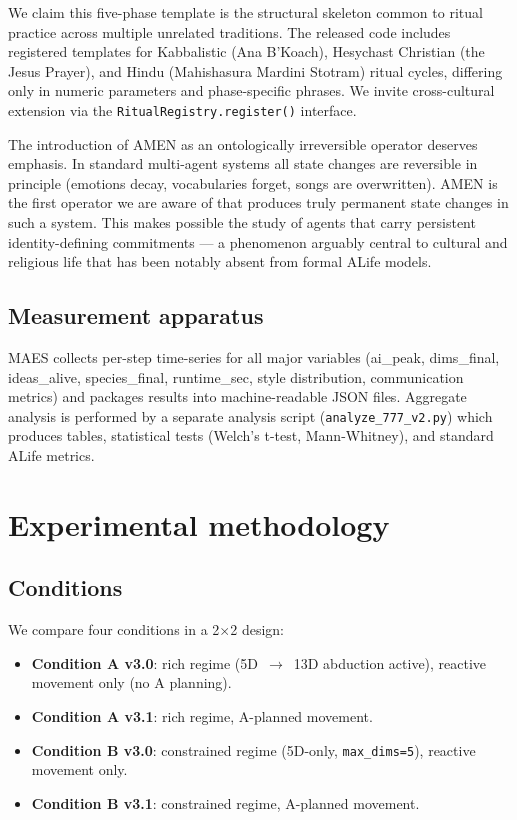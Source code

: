 \documentclass[11pt,a4paper]{article}
\begin{document}
We claim this five-phase template is the structural skeleton common to
ritual practice across multiple unrelated traditions. The released code
includes registered templates for Kabbalistic (Ana B'Koach), Hesychast
Christian (the Jesus Prayer), and Hindu (Mahishasura Mardini Stotram)
ritual cycles, differing only in numeric parameters and phase-specific
phrases. We invite cross-cultural extension via the
\texttt{RitualRegistry.register()} interface.

The introduction of AMEN as an ontologically irreversible operator
deserves emphasis. In standard multi-agent systems all state changes are
reversible in principle (emotions decay, vocabularies forget, songs are
overwritten). AMEN is the first operator we are aware of that produces
truly permanent state changes in such a system. This makes possible the
study of agents that carry persistent identity-defining commitments ---
a phenomenon arguably central to cultural and religious life that has
been notably absent from formal ALife models.

\subsection{Measurement apparatus}

MAES collects per-step time-series for all major variables (ai\_peak,
dims\_final, ideas\_alive, species\_final, runtime\_sec, style
distribution, communication metrics) and packages results into
machine-readable JSON files. Aggregate analysis is performed by a
separate analysis script (\texttt{analyze\_777\_v2.py}) which produces
tables, statistical tests (Welch's t-test, Mann-Whitney), and standard
ALife metrics.

\section{Experimental methodology}
\label{sec:method}

\subsection{Conditions}

We compare four conditions in a 2$\times$2 design:

\begin{itemize}
\item \textbf{Condition A v3.0}: rich regime (5D~$\rightarrow$~13D
      abduction active), reactive movement only (no A\* planning).
\item \textbf{Condition A v3.1}: rich regime, A\*-planned movement.
\item \textbf{Condition B v3.0}: constrained regime (5D-only,
      \texttt{max\_dims=5}), reactive movement only.
\item \textbf{Condition B v3.1}: constrained regime, A\*-planned
      movement.
\end{itemize}
\end{document}
